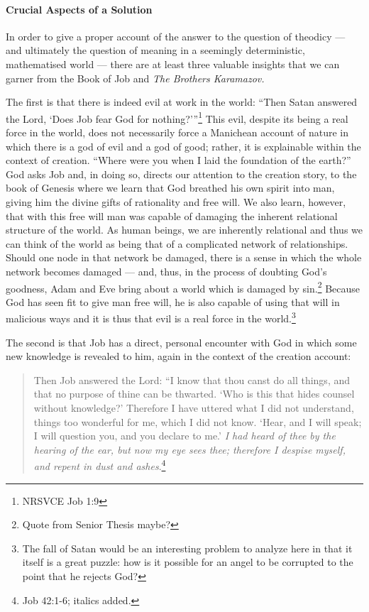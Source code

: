 \documentclass[12pt]{article}
\begin{document}
	\paragraph*{Crucial Aspects of a Solution} In order to give a proper account of the answer to the question of theodicy --- and ultimately the question of meaning in a seemingly deterministic, mathematised world --- there are at least three valuable insights that we can garner from the Book of Job and \emph{The Brothers Karamazov.} 
	
	The first is that there is indeed evil at work in the world: ``Then Satan answered the Lord, `Does Job fear God for nothing?'\thinspace''\footnote{NRSVCE Job 1:9} This evil, despite its being a real force in the world, does not necessarily force a Manichean account of nature in which there is a god of evil and a god of good; rather, it is explainable within the context of creation. ``Where were you when I laid the foundation of the earth?'' God asks Job and, in doing so, directs our attention to the creation story, to the book of Genesis where we learn that God breathed his own spirit into man, giving him the divine gifts of rationality and free will. We also learn, however, that with this free will man was capable of damaging the inherent relational structure of the world. As human beings, we are inherently relational and thus we can think of the world as being that of a complicated network of relationships. Should one node in that network be damaged, there is a sense in which the whole network becomes damaged --- and, thus, in the process of doubting God's goodness, Adam and Eve bring about a world which is damaged by sin.\footnote{Quote from Senior Thesis maybe?} Because God has seen fit to give man free will, he is also capable of using that will in malicious ways and it is thus that evil is a real force in the world.\footnote{The fall of Satan would be an interesting problem to analyze here in that it itself is a great puzzle: how is it possible for an angel to be corrupted to the point that he rejects God?}  
	
	The second is that Job has a direct, personal encounter with God in which some new knowledge is revealed to him, again in the context of the creation account:
	
	\begin{quote}
	\singlespacing
	\footnotesize
Then Job answered the Lord: ``I know that thou canst do all things, and that no purpose of thine can be thwarted. `Who is this that hides counsel without knowledge?' Therefore I have uttered what I did not understand, things too wonderful for me, which I did not know. `Hear, and I will speak; I will question you, and you declare to me.' \emph{I had heard of thee by the hearing of the ear, but now my eye sees thee; therefore I despise myself, and repent in dust and ashes}.\footnote{Job 42:1-6; italics added.} 
\end{quote} 
\end{document}
